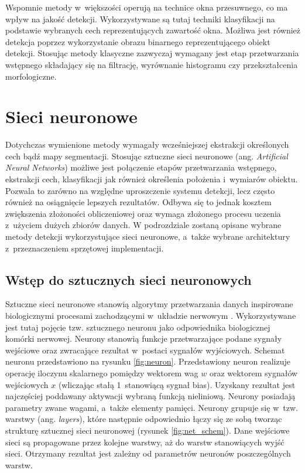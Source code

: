
Wspomnie metody w~większości operują na technice okna przesuwnego, co ma wpływ na jakość detekcji.
Wykorzystywane są tutaj techniki klasyfikacji na podstawie wybranych cech reprezentujących zawartość okna.
Możliwa jest również detekcja poprzez wykorzystanie obrazu binarnego reprezentującego obiekt detekcji.
Stosując metody klasyczne zazwyczaj wymagany jest etap przetwarzania wstępnego składający się na filtrację, wyrównanie histogramu czy przekształcenia morfologiczne.


\section{Sieci neuronowe}

Dotychczas wymienione metody wymagały wcześniejszej ekstrakcji określonych cech bądź mapy segmentacji.
Stosując sztuczne sieci neuronowe (ang. \emph{Artificial Neural Networks}) możliwe jest połączenie etapów przetwarzania wstępnego, ekstrakcji cech, klasyfikacji jak również określenia położenia i~wymiarów obiektu. 
Pozwala to zarówno na względne uproszczenie systemu detekcji, lecz często również na osiągnięcie lepszych rezultatów. 
Odbywa się to jednak kosztem zwiększenia złożoności obliczeniowej oraz wymaga złożonego procesu uczenia z~użyciem dużych zbiorów danych.
W podrozdziale zostaną opisane wybrane metody detekcji wykorzystujące sieci neuronowe, a~także wybrane architektury z~przeznaczeniem sprzętowej implementacji.

\subsection{Wstęp do sztucznych sieci neuronowych}
Sztuczne sieci neuronowe stanowią algorytmy przetwarzania danych inspirowane biologicznymi procesami zachodzącymi w~układzie nerwowym \cite{SN_tadeusiewicz}. 
Wykorzystywane jest tutaj pojęcie tzw. sztucznego neuronu jako odpowiednika biologicznej komórki nerwowej. 
Neurony stanowią funkcje przetwarzające podane sygnały wejściowe oraz zwracające rezultat w~postaci sygnałów wyjściowych. 
Schemat neuronu przedstawiono na rysunku \ref{fig:neuron}.
Przedstawiony neuron realizuje operację iloczynu skalarnego pomiędzy wektorem wag $w$ oraz wektorem sygnałów wejściowych $x$ (wliczając stałą 1~stanowiącą sygnał bias).
Uzyskany rezultat jest najczęściej poddawany aktywacji wybraną funkcją nieliniową.
Neurony posiadają parametry zwane wagami, a~także elementy pamięci.
Neurony grupuje się w~tzw. warstwy (ang. \emph{layers}), które następnie odpowiednio łączy się ze sobą tworząc strukturę sztucznej sieci neuronowej (rysunek \ref{fig:net_schem}).
Dane wejściowe sieci są propagowane przez kolejne warstwy, aż do warstw stanowiących wyjść sieci.
Otrzymany rezultat jest zależny od parametrów neuronów poszczególnych warstw.

